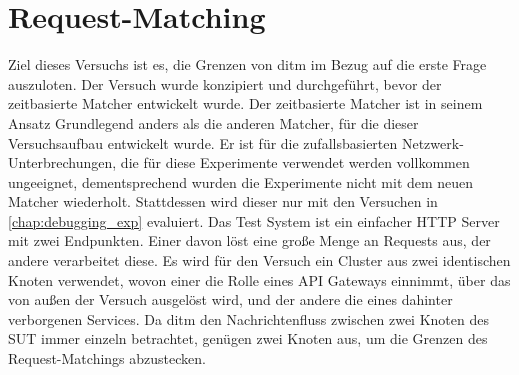 \documentclass[12pt,a4paper]{report}
\begin{document}
\section{Request-Matching}
Ziel dieses Versuchs ist es, die Grenzen von ditm im Bezug auf die erste Frage auszuloten.
Der Versuch wurde konzipiert und durchgeführt, bevor der zeitbasierte Matcher entwickelt wurde. Der zeitbasierte Matcher ist
in seinem Ansatz Grundlegend anders als die anderen Matcher, für die dieser Versuchsaufbau entwickelt wurde. Er ist für die
zufallsbasierten Netzwerk-Unterbrechungen, die für diese Experimente verwendet werden vollkommen ungeeignet, dementsprechend
wurden die Experimente nicht mit dem neuen Matcher wiederholt. Stattdessen wird dieser nur mit den Versuchen in
\ref{chap:debugging_exp} evaluiert.
Das Test System ist ein einfacher HTTP Server mit zwei Endpunkten. Einer davon löst eine große Menge an Requests aus, der andere
verarbeitet diese. Es wird für den Versuch ein Cluster aus zwei identischen Knoten verwendet, wovon einer die Rolle eines API
Gateways einnimmt, über das von außen der Versuch ausgelöst wird, und der andere die eines dahinter verborgenen Services. Da ditm
den Nachrichtenfluss zwischen zwei Knoten des SUT immer einzeln betrachtet, genügen zwei Knoten aus, um die Grenzen des
Request-Matchings abzustecken.
\end{document}
